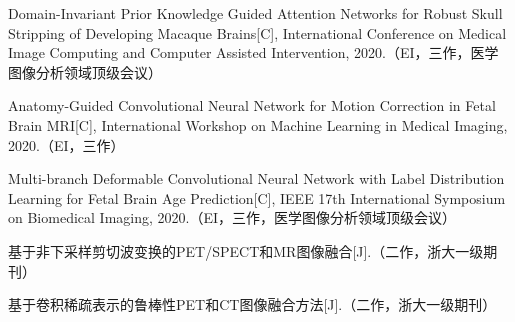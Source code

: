 {        \noindent [11] Domain-Invariant Prior Knowledge Guided Attention Networks for Robust Skull Stripping of Developing Macaque Brains[C],  International Conference on Medical Image Computing and Computer Assisted Intervention, 2020.（EI，三作，医学图像分析领域顶级会议）
        
        \noindent [12] Anatomy-Guided Convolutional Neural Network for Motion Correction in Fetal Brain MRI[C], International Workshop on Machine Learning in Medical Imaging, 2020.（EI，三作）
        
        \noindent [13] Multi-branch Deformable Convolutional Neural Network with Label Distribution Learning for Fetal Brain Age Prediction[C], IEEE 17th International Symposium on Biomedical Imaging, 2020.（EI，三作，医学图像分析领域顶级会议）
        
        \noindent [14] 基于非下采样剪切波变换的PET/SPECT和MR图像融合[J].（二作，浙大一级期刊）
        
        \noindent [15] 基于卷积稀疏表示的鲁棒性PET和CT图像融合方法[J].（二作，浙大一级期刊）
        }